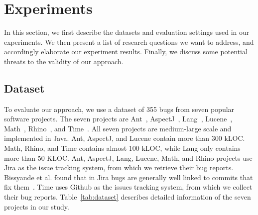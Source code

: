 \section{Experiments }
\label{sec.exp}

In this section, we first describe the datasets and evaluation settings used in our experiments. We then present a list of research questions we want to address, and accordingly elaborate our experiment results. Finally, we discuss some potential threats to the validity of our approach.


\subsection{Dataset}\label{sec:dataset}


To evaluate our approach, we use a dataset of 355 bugs from seven popular software projects. The seven projects are Ant~\cite{ant_link}, AspectJ~\cite{aspectj_link}, Lang~\cite{lang_link}, Lucene~\cite{lucene_link}, Math~\cite{math_link}, Rhino~\cite{rhino_link}, and Time~\cite{time_link}. All seven projects are medium-large scale and implemented in Java. Ant, AspectJ, and Lucene contain more than 300 kLOC. Math, Rhino, and Time contains almost 100 kLOC, while Lang only contains more than 50 KLOC. Ant, AspectJ, Lang, Lucene, Math, and Rhino projects use Jira as the issue tracking system, from which we retrieve their bug reports. Bissyande et al. found that in Jira bugs are generally well linked to commits that fix them~\cite{BissyandeTWLJR13}. Time uses Github as the issues tracking system, from which we collect their bug reports. Table~\ref{tab:dataset} describes detailed information of the seven projects in our study.

